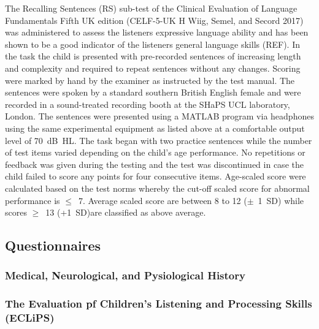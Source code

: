\documentclass[a4paper,nobind]{templates/ociamthesis}
\begin{document}
The Recalling Sentences (RS) sub-test of the Clinical Evaluation of Language Fundamentals Fifth UK edition (CELF-5-UK H Wiig, Semel, and Secord 2017) was administered to assess the listeners expressive language ability and has been shown to be a good indicator of the listeners general language skills (REF). In the task the child is presented with pre-recorded sentences of increasing length and complexity and required to repeat sentences without any changes. Scoring were marked by hand by the examiner as instructed by the test manual. The sentences were spoken by a standard southern British English female and were recorded in a sound-treated recording booth at the SHaPS UCL laboratory, London. The sentences were presented using a MATLAB program via headphones using the same experimental equipment as listed above at a comfortable output level of 70~dB~HL. The task began with two practice sentences while the number of test items varied depending on the child's age performance. No repetitions or feedback was given during the testing and the test was discontinued in case the child failed to score any points for four consecutive items. Age-scaled score were calculated based on the test norms whereby the cut-off scaled score for abnormal performance is \(\leq\)~7. Average scaled score are between 8 to 12 (\(\pm\)~1~SD) while scores \(\geq\)~13 (+1~SD)are classified as above average.

\hypertarget{questionnaires}{%
\subsection{Questionnaires}\label{questionnaires}}

\hypertarget{medical-neurological-and-pysiological-history}{%
\subsubsection*{Medical, Neurological, and Pysiological History}\label{medical-neurological-and-pysiological-history}}

\hypertarget{the-evaluation-pf-childrens-listening-and-processing-skills-eclips}{%
\subsubsection*{The Evaluation pf Children's Listening and Processing Skills (ECLiPS)}\label{the-evaluation-pf-childrens-listening-and-processing-skills-eclips}}
\end{document}
